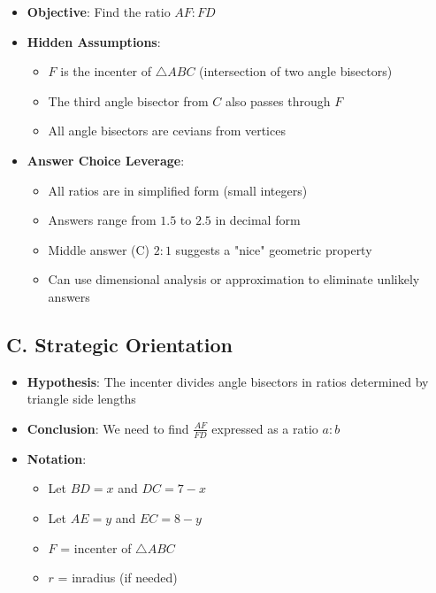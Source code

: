 \documentclass[12pt]{article}
\begin{document}
\begin{problemconfigbox}
\begin{itemize}[leftmargin=*]
    \item \textbf{Objective}: Find the ratio $AF : FD$
    
    \item \textbf{Hidden Assumptions}: 
    \begin{itemize}
        \item $F$ is the incenter of $\triangle ABC$ (intersection of two angle bisectors)
        \item The third angle bisector from $C$ also passes through $F$
        \item All angle bisectors are cevians from vertices
    \end{itemize}
    
    \item \textbf{Answer Choice Leverage}: 
    \begin{itemize}
        \item All ratios are in simplified form (small integers)
        \item Answers range from $1.5$ to $2.5$ in decimal form
        \item Middle answer (C) $2:1$ suggests a "nice" geometric property
        \item Can use dimensional analysis or approximation to eliminate unlikely answers
    \end{itemize}
\end{itemize}

\subsection*{C. Strategic Orientation}
\begin{itemize}[leftmargin=*]
    \item \textbf{Hypothesis}: The incenter divides angle bisectors in ratios determined by triangle side lengths
    
    \item \textbf{Conclusion}: We need to find $\frac{AF}{FD}$ expressed as a ratio $a:b$
    
    \item \textbf{Notation}: 
    \begin{itemize}
        \item Let $BD = x$ and $DC = 7-x$
        \item Let $AE = y$ and $EC = 8-y$
        \item $F$ = incenter of $\triangle ABC$
        \item $r$ = inradius (if needed)
    \end{itemize}
    

\end{itemize}
\end{problemconfigbox}
\end{document}
